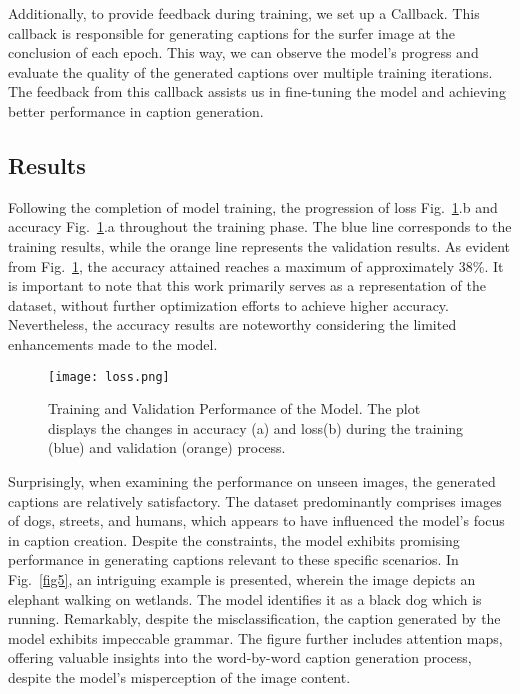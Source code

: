 \documentclass[runningheads]{llncs}
\begin{document}
Additionally, to provide feedback during training, we set up a Callback. This callback is responsible for generating captions for the surfer image at the conclusion of each epoch. This way, we can observe the model's progress and evaluate the quality of the generated captions over multiple training iterations. The feedback from this callback assists us in fine-tuning the model and achieving better performance in caption generation.

\subsection{Results}

Following the completion of model training, the progression of loss Fig.~\ref{fig4}.b and accuracy  Fig.~\ref{fig4}.a throughout the training phase. The blue line corresponds to the training results, while the orange line represents the validation results.
As evident from Fig.~\ref{fig4}, the accuracy attained reaches a maximum of approximately 38\%. It is important to note that this work primarily serves as a representation of the dataset, without further optimization efforts to achieve higher accuracy. Nevertheless, the accuracy results are noteworthy considering the limited enhancements made to the model.

\begin{figure}
  \texttt{[image: loss.png]}
  \caption{Training and Validation Performance of the Model. The plot displays the changes in accuracy (a) and loss(b) during the training (blue) and validation (orange) process.} \label{fig4}
\end{figure}

Surprisingly, when examining the performance on unseen images, the generated captions are relatively satisfactory. The dataset predominantly comprises images of dogs, streets, and humans, which appears to have influenced the model's focus in caption creation. Despite the constraints, the model exhibits promising performance in generating captions relevant to these specific scenarios. In Fig.~\ref{fig5}, an intriguing example is presented, wherein the image depicts an elephant walking on wetlands. The model identifies it as a black dog which is running. Remarkably, despite the misclassification, the caption generated by the model exhibits impeccable grammar. The figure further includes attention maps, offering valuable insights into the word-by-word caption generation process, despite the model's misperception of the image content.
\end{document}
